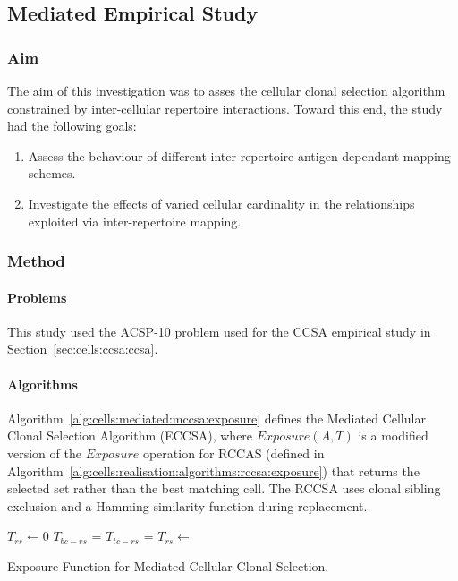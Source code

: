 %
%
\subsection{Mediated Empirical Study}
%
%
\subsubsection{Aim}
The aim of this investigation was to asses the cellular clonal selection algorithm constrained by inter-cellular repertoire interactions. Toward this end, the study had the following goals:

\begin{enumerate}	
	\item Assess the behaviour of different inter-repertoire antigen-dependant mapping schemes.
	\item Investigate the effects of varied cellular cardinality in the relationships exploited via inter-repertoire mapping.
\end{enumerate}

%
%
\subsubsection{Method}

%
%
\paragraph{Problems}
This study used the ACSP-10 problem used for the CCSA empirical study in Section~\ref{sec:cells:ccsa:ccsa}.

%
%
\paragraph{Algorithms}
Algorithm~\ref{alg:cells:mediated:mccsa:exposure} defines the Mediated Cellular Clonal Selection Algorithm (ECCSA), where $Exposure(A, T)$ is a modified version of the $Exposure$ operation for RCCAS (defined in Algorithm~\ref{alg:cells:realisation:algorithms:rccsa:exposure}) that returns the selected set rather than the best matching cell. The RCCSA uses clonal sibling exclusion and a Hamming similarity function during replacement.

\begin{algorithm}[htp]
  \SetLine
  
	
	$T_{rs} \leftarrow$0\;
	$T_{bc-rs}$ = \;
	$T_{tc-rs}$ = \;	
	$T_{rs} \leftarrow$ \;
	\;
	\caption{Exposure Function for Mediated Cellular Clonal Selection.}
	\label{alg:cells:mediated:mccsa:exposure}
\end{algorithm}	

